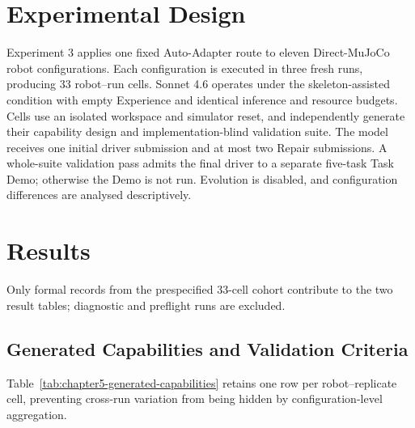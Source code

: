 \section[Experimental Design]{Experimental Design}

Experiment 3 applies one fixed Auto-Adapter route to eleven Direct-MuJoCo
robot configurations. Each configuration is executed in three fresh runs,
producing 33 robot--run cells. Sonnet 4.6 operates under the skeleton-assisted
condition with empty Experience and identical inference and resource budgets.
Cells use an isolated workspace and simulator reset, and independently
generate their capability design and implementation-blind validation suite.
The model receives one initial driver submission and at most two Repair
submissions. A whole-suite validation pass admits the final driver to a
separate five-task Task Demo; otherwise the Demo is not run. Evolution is
disabled, and configuration differences are analysed descriptively.

\section[Results]{Results}

Only formal records from the prespecified 33-cell cohort contribute to the two
result tables; diagnostic and preflight runs are excluded.

\subsection[Generated Capabilities and Validation Criteria]
{Generated Capabilities and Validation Criteria}

Table~\ref{tab:chapter5-generated-capabilities} retains one row per
robot--replicate cell, preventing cross-run variation from being hidden by
configuration-level aggregation.

